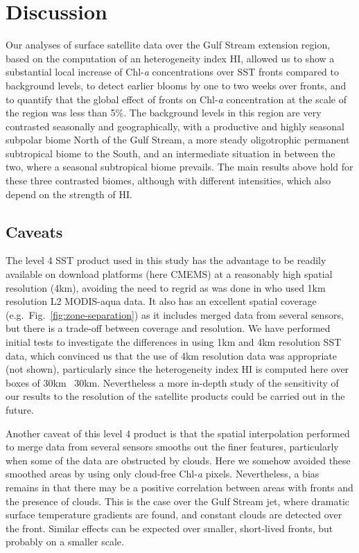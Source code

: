 \section{Discussion}

Our analyses of surface satellite data over the Gulf Stream extension region, based on the computation of an heterogeneity index HI, allowed us to show a substantial local increase of Chl\nobreakdash-\emph{a} concentrations over SST fronts compared to background levels, to detect earlier blooms by one to two weeks over fronts, and to quantify that the global effect of fronts on Chl\nobreakdash-\emph{a} concentration at the scale of the region was less than 5\%.
The background levels in this region are very contrasted seasonally and geographically, with a productive and highly seasonal subpolar biome North of the Gulf Stream, a more steady oligotrophic permanent subtropical biome to the South, and an intermediate situation in between the two, where a seasonal subtropical biome prevails.
The main results above hold for these three contrasted biomes, although with different intensities, which also depend on the strength of HI.\@

\subsection{Caveats}

The level 4 SST product used in this study has the advantage to be readily available on download platforms (here CMEMS) at a reasonably high spatial resolution (4km), avoiding the need to regrid as was done in \citet{liu_2016} who used 1km resolution L2 MODIS-aqua data.
It also has an excellent spatial coverage (e.g.\ Fig.~\ref{fig:zone-separation}) as it includes merged data from several sensors, but there is a trade-off between coverage and resolution.
We have performed initial tests to investigate the differences in using 1km and 4km resolution SST data, which convinced us that the use of 4km resolution data was appropriate (not shown), particularly since the heterogeneity index HI is computed here over boxes of 30km \texttimes\ 30km.
Nevertheless a more in-depth study of the sensitivity of our results to the resolution of the satellite products could be carried out in the future.

Another caveat of this level 4 product is that the spatial interpolation performed to merge data from several sensors smooths out the finer features, particularly when some of the data are obstructed by clouds.
Here we somehow avoided these smoothed areas by using only cloud-free Chl\nobreakdash-\emph{a} pixels.
Nevertheless, a bias remains in that there may be a positive correlation between areas with fronts and the presence of clouds.
This is the case over the Gulf Stream jet, where dramatic surface temperature gradients are found, and constant clouds are detected over the front.
Similar effects can be expected over smaller, short-lived fronts, but probably on a smaller scale.

